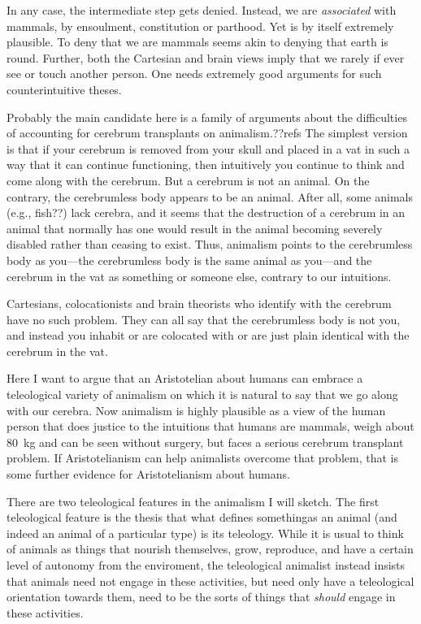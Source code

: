 In any case, the intermediate step  gets denied. Instead, we are 
\textit{associated} with mammals, by ensoulment, constitution or parthood.   Yet  is by itself extremely plausible. 
To deny that we are mammals seems akin to denying that earth
is round. Further, both the Cartesian and brain views imply that we
rarely if ever see or touch another person. One needs extremely good arguments for such counterintuitive theses. 

Probably the main candidate here is a family of arguments about the difficulties of accounting for cerebrum transplants
on animalism.??refs The simplest version is that if your cerebrum is removed from your skull and placed in a vat in such a way
that it can continue functioning, then intuitively you continue to think and come along with the cerebrum. But a cerebrum
is not an animal. On the contrary, the cerebrumless body appears to be an animal. After all, some animals (e.g., fish??) lack
cerebra, and it seems that the destruction of a cerebrum in an animal that normally has one would result in the animal 
becoming severely disabled rather than ceasing to exist. Thus, animalism points to the cerebrumless body as you---the cerebrumless
body is the same animal as you---and the cerebrum in the vat as something  or someone else, contrary to our intuitions.

Cartesians, colocationists and brain theorists who identify with the cerebrum have no such problem. They can all say that
the cerebrumless body is not you, and instead you inhabit or are colocated with or are just plain identical with the cerebrum
in the vat. 

Here I want to argue that an Aristotelian about humans can embrace a teleological variety of animalism on which it is natural to say that 
we go along with our cerebra. Now animalism is highly plausible as 
a view of the human person that does justice to the intuitions that humans are mammals, weigh about 80~kg and can be seen 
without surgery, but faces a serious cerebrum transplant problem. If Aristotelianism can help animalists overcome that problem,
that is some further evidence for Aristotelianism about humans.

There are two teleological features in the animalism I will sketch. The first teleological feature is the thesis 
that what defines somethingas an animal (and indeed an animal of a particular type) is its teleology. While it is usual to 
think of animals as things that nourish themselves, grow, reproduce, and have a certain level of autonomy from the enviroment, 
the teleological animalist instead insists that animals need not engage in these activities, but need only have a teleological
orientation towards them, need to be the sorts of things that \textit{should} engage in these activities. 

